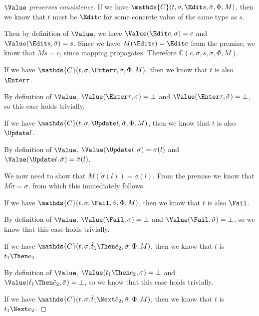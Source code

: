 \begin{proof}[$\Value$ preserves consistence]

    {
    If we have $\mathds{C}(t,\sigma,\Edit s,\tilde{\sigma},\Phi,M)$, then we know that $t$ must be $\Edit c$ for some concrete value of the same type as $s$.

    Then by definition of $\Value$, we have $\Value(\Edit c,\sigma)=c$ and $\Value(\Edit s,\tilde{\sigma})=s$.
    Since we have $M(\Edit s)=\Edit c$ from the premise, we know that $M s = c$, since mapping propagates.
    Therefore $\mathds{C}(c,\sigma,s,\tilde{\sigma},\Phi,M)$.
    }

    {
    If we have $\mathds{C}(t,\sigma,\Enter \tau,\tilde{\sigma},\Phi,M)$, then we know that $t$ is also $\Enter\tau$.

    By definition of $\Value$, $\Value(\Enter \tau,\sigma)=\bot$ and $\Value(\Enter\tau,\tilde{\sigma})=\bot$,
    so this case holds trivially.
    }

    {
    If we have $\mathds{C}(t,\sigma,\Update l,\tilde{\sigma},\Phi,M)$, then we know that $t$ is also $\Update l$.

    By definition of $\Value$, $\Value(\Update l,\sigma)=\sigma(l)$ and $\Value(\Update l,\tilde{\sigma})=\tilde{\sigma}(l)$.

    We now need to show that $M(\tilde{\sigma}(l))=\sigma(l)$. From the premise we know that $M\tilde{\sigma}=\sigma$, from which this immediately follows.
    }

    {
    If we have $\mathds{C}(t,\sigma,\Fail,\tilde{\sigma},\Phi,M)$, then we know that $t$ is also $\Fail$.

    By definition of $\Value$, $\Value(\Fail,\sigma)=\bot$ and $\Value(\Fail,\tilde{\sigma})=\bot$, so we know that this case holds trivially.
    }

    {
    If we have $\mathds{C}(t,\sigma,\tilde{t}_1\Then \tilde{e}_2,\tilde{\sigma},\Phi,M)$, then we know that $t$ is $t_1\Then e_2$.

    By definition of $\Value$, $\Value(t_1\Then e_2,\sigma)=\bot$ and $\Value(\tilde{t}_1\Then \tilde{e}_2,\tilde{\sigma})=\bot$, so we know that this case holds trivially.

    }


    {
    If we have $\mathds{C}(t,\sigma,\tilde{t}_1\Next \tilde{e}_2,\tilde{\sigma},\Phi,M)$, then we know that $t$ is $t_1\Next e_2$.

}
\end{proof}
